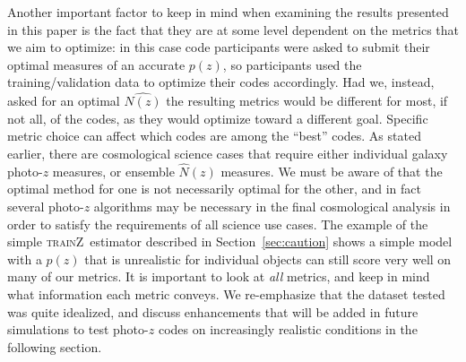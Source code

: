 \documentclass[usenatbib]{mn2e}
\newcommand{\trainz}{\textsc{trainZ}}
\newcommand{\red}[1]{\textcolor{red}{#1}}
\newcommand{\aim}[1]{\textcolor{green}{#1}}%
\begin{document}
Another important factor to keep in mind when examining the results presented in this paper is the fact that they are at some level dependent on the metrics that we aim to optimize: in this case code participants were asked to submit their optimal measures of an accurate $p(z)$, so participants used the training/validation data to optimize their codes accordingly.  Had we, instead, asked for an optimal $\hat{N(z)}$ the resulting metrics would be different for most, if not all, of the codes, as they would optimize toward a different goal.  Specific metric choice can affect which codes are among the ``best'' codes.  As stated earlier, there are cosmological science cases that require either individual galaxy photo-$z$ measures, or ensemble $\hat{N}(z)$ measures.  We must be aware of that the optimal method for one is not necessarily optimal for the other, and in fact several photo-$z$ algorithms may be necessary in the final cosmological analysis in order to satisfy the requirements of all science use cases.  The example of the simple \trainz\ estimator described in Section~\ref{sec:caution} shows a simple model with a $p(z)$ that is unrealistic for individual objects can still score very well on many of our metrics.  It is important to look at {\it all} metrics, and keep in mind what information each metric conveys.
We re-emphasize that the dataset tested was quite idealized, and discuss enhancements that will be added in future simulations to test photo-$z$ codes on increasingly realistic conditions in the following section.
\end{document}
